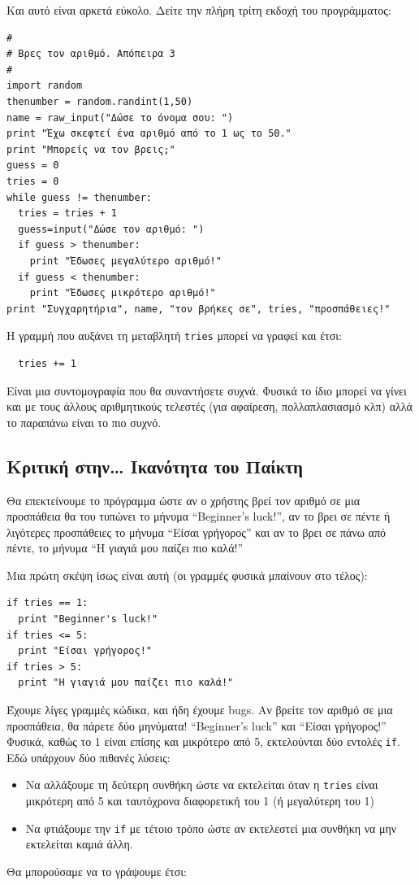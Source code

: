 Και αυτό είναι αρκετά εύκολο. Δείτε την πλήρη τρίτη εκδοχή του προγράμματος:

\begin{verbatim}
#
# Βρες τον αριθμό. Απόπειρα 3
#
import random
thenumber = random.randint(1,50)
name = raw_input("Δώσε το όνομα σου: ")
print "Έχω σκεφτεί ένα αριθμό από το 1 ως το 50."
print "Μπορείς να τον βρεις;"
guess = 0
tries = 0
while guess != thenumber:
  tries = tries + 1
  guess=input("Δώσε τον αριθμό: ")
  if guess > thenumber:
    print "Έδωσες μεγαλύτερο αριθμό!"
  if guess < thenumber:
    print "Έδωσες μικρότερο αριθμό!"
print "Συγχαρητήρια", name, "τον βρήκες σε", tries, "προσπάθειες!"
\end{verbatim}

Η γραμμή που αυξάνει τη μεταβλητή {\tt tries} μπορεί να γραφεί και έτσι:

\begin{verbatim}
  tries += 1
\end{verbatim}

Είναι μια συντομογραφία που θα συναντήσετε συχνά. Φυσικά το ίδιο μπορεί να γίνει και με τους άλλους αριθμητικούς τελεστές (για αφαίρεση, πολλαπλασιασμό κλπ)
αλλά το παραπάνω είναι το πιο συχνό.
%
\subsection{Κριτική στην\ldots{} Ικανότητα του Παίκτη}
%
Θα επεκτείνουμε το πρόγραμμα ώστε αν ο χρήστης βρεί τον αριθμό σε μια προσπάθεια θα του τυπώνει το μήνυμα ``Beginner's luck!'', αν το βρει σε πέντε ή λιγότερες προσπάθειες το μήνυμα ``Είσαι γρήγορος'' και αν το βρει σε πάνω από πέντε, το μήνυμα ``Η γιαγιά μου παίζει πιο καλά!''

Μια πρώτη σκέψη ίσως είναι αυτή (οι γραμμές
φυσικά μπαίνουν στο τέλος):

\begin{verbatim}
if tries == 1:
  print "Beginner's luck!"
if tries <= 5:
  print "Είσαι γρήγορος!"
if tries > 5:
  print "Η γιαγιά μου παίζει πιο καλά!"
\end{verbatim}

Έχουμε λίγες γραμμές κώδικα, και ήδη έχουμε bugs. Αν βρείτε τον
αριθμό σε μια προσπάθεια, θα πάρετε δύο μηνύματα! ``Beginner's luck'' και
``Είσαι γρήγορος!'' Φυσικά, καθώς το 1 είναι επίσης και μικρότερο από 5,
εκτελούνται δύο εντολές {\tt if}. Εδώ υπάρχουν δύο πιθανές λύσεις:
%
\begin{itemize}
\item Να αλλάξουμε τη δεύτερη συνθήκη ώστε να εκτελείται όταν η
            {\tt tries} είναι μικρότερη από 5 και ταυτόχρονα διαφορετική του 1
            (ή μεγαλύτερη του 1)
\item Να φτιάξουμε την {\tt if} με τέτοιο τρόπο ώστε αν εκτελεστεί μια
            συνθήκη να μην εκτελείται καμιά άλλη.
\end{itemize}
%
Θα μπορούσαμε να το γράψουμε έτσι:

